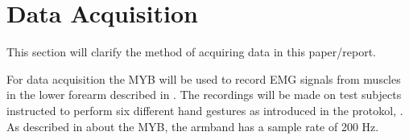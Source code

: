 \section{Data Acquisition} \label{sec:dataAcquisition}

This section will clarify the method of acquiring data in this paper/report.

For data acquisition the MYB will be used to record EMG signals from muscles in the lower forearm described in . The recordings will be made on test subjects instructed to perform six different hand gestures as introduced in the protokol, . As described in  about the MYB, the armband has a sample rate of 200 Hz. 


